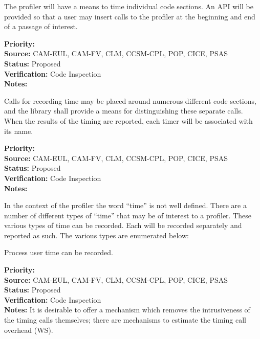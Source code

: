 

The profiler will have a means to time individual code sections.  An API will be 
provided so that a user may insert calls to the profiler at the beginning and
end of a passage of interest.

\begin{reqlist}
{\bf Priority:} \\
{\bf Source:} CAM-EUL, CAM-FV, CLM, CCSM-CPL, POP, CICE, PSAS \\
{\bf Status:} Proposed \\
{\bf Verification:} Code Inspection \\
{\bf Notes:} 
\end{reqlist}


Calls for recording time may be placed around numerous different code sections, 
and the library shall provide a means for distinguishing these separate calls.  When
the results of the timing are reported, each timer will be associated with its name.

\begin{reqlist}
{\bf Priority:} \\
{\bf Source:} CAM-EUL, CAM-FV, CLM, CCSM-CPL, POP, CICE, PSAS \\
{\bf Status:} Proposed \\
{\bf Verification:} Code Inspection \\
{\bf Notes:} 
\end{reqlist}


In the context of the profiler the word ``time'' is not well defined.  There are
a number of different types of ``time'' that may be of interest to a profiler.
These various types of time can be recorded.  Each will be recorded separately and reported
as such.  The various types are enumerated below:


Process user time can be recorded.

\begin{reqlist}
{\bf Priority:}  \\
{\bf Source:} CAM-EUL, CAM-FV, CLM, CCSM-CPL, POP, CICE, PSAS \\
{\bf Status:} Proposed \\
{\bf Verification:} Code Inspection \\
{\bf Notes:} It is desirable to offer a mechanism which removes the
  intrusiveness of the timing calls themselves; there are mechanisms
  to estimate the timing call overhead (WS).
  
\end{reqlist}

